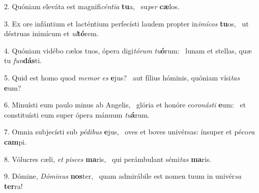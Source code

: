 2. Quóniam eleváta est magnifi\textit{cén}\textit{ti}\textit{a} \textbf{tu}a, \ast\  su\textit{per} \textbf{cæ}los.\

3. Ex ore infántium et lacténtium perfecísti laudem propter in\textit{i}\textit{mí}\textit{cos} \textbf{tu}os, \ast\  ut déstruas inimícum et \textit{ul}\textbf{tó}rem.\

4. Quóniam vidébo cælos tuos, ópera digi\textit{tó}\textit{rum} \textit{tu}\textbf{ó}rum: \ast\  lunam et stellas, quæ tu \textit{fun}\textbf{dás}ti.\

5. Quid est homo quod \textit{me}\textit{mor} \textit{es} \textbf{e}jus? \ast\  aut fílius hóminis, quóniam vísi\textit{tas} \textbf{e}um?\

6. Minuísti eum paulo minus ab Angelis, \dag\  glória et honóre co\textit{ro}\textit{nás}\textit{ti} \textbf{e}um: \ast\  et constituísti eum super ópera mánuum \textit{tu}\textbf{á}rum.\

7. Omnia subjecísti sub \textit{pé}\textit{di}\textit{bus} \textbf{e}jus, \ast\  oves et boves univérsas: ínsuper et péco\textit{ra} \textbf{cam}pi.\

8. Vólucres cæli, \textit{et} \textit{pi}\textit{sces} \textbf{ma}ris, \ast\  qui perámbulant sémi\textit{tas} \textbf{ma}ris.\

9. Dómine, \textit{Dó}\textit{mi}\textit{nus} \textbf{nos}ter, \ast\  quam admirábile est nomen tuum in univér\textit{sa} \textbf{ter}ra!\

